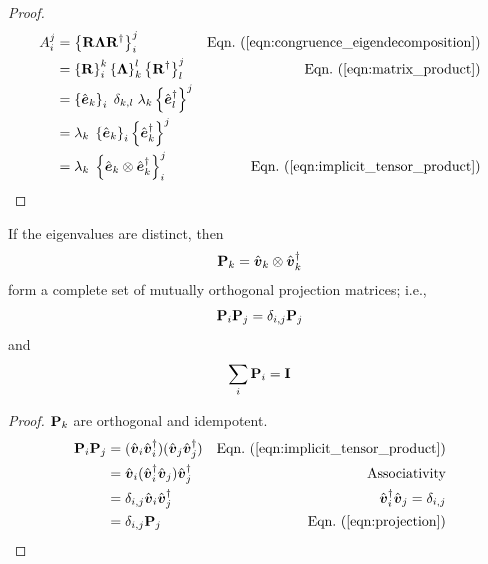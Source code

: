\begin{proof}

\begin{align*}
A_i^j
&= \left\{ {\bf{R}} \cohM{\Lambda} {\bf{R}}^\dagger \right\}_i^j 
    & \peqn{congruence_eigendecomposition} \\
&=  \left\{ {\bf{R}} \right\}_i^k
    \left\{ \cohM{\Lambda} \right\}_k^l
    \left\{ {\bf{R}}^\dagger \right\}_l^j 
    & \peqn{matrix_product} \\
&= \left\{ \hat{\Jcol{e}}_k \right\}_i \; \delta_{k,l} \; \lambda_k \left\{ \hat{\Jcol{e}}_l^\dagger \right\}^j \\
&= \lambda_k \;\left\{ \hat{\Jcol{e}}_k \right\}_i \left\{ \hat{\Jcol{e}}_k^\dagger \right\}^j \\
&= \lambda_k \; \left\{ \hat{\Jcol{e}}_k \otimes \hat{\Jcol{e}}_k^\dagger \right\}_i^j
    & \peqn{implicit_tensor_product}
\label{eqn:eigen_sum}
\end{align*}
%
\end{proof}
\noindent
If the eigenvalues are distinct, then
\begin{equation}
\label{eqn:projection}
{\bf P}_k=\hat{\mbox{\boldmath $v$}}_k \otimes \hat{\mbox{\boldmath $v$}}_k^\dagger
\end{equation}
form a complete set of mutually orthogonal projection matrices; i.e.,
\begin{equation}
\label{eqn:idempotent_orthogonal}
{\bf P}_i {\bf P}_j = \delta_{i,j} {\bf P}_j
\end{equation}
and
\begin{equation}
\sum_i {\bf P}_i = {\bf I}
\label{eqn:projection_complete}
\end{equation}
%
\begin{proof}
\label{proof:orthogonal_idempotent}
${\bf P}_k$ are orthogonal and idempotent.
\begin{align*}
\JM{P}_i \JM{P}_j &= 
(\hat{\Jcol{v}}_i  \hat{\Jcol{v}}_i^\dagger)
(\hat{\Jcol{v}}_j  \hat{\Jcol{v}}_j^\dagger) 
    & \peqn{implicit_tensor_product} \\
&= \hat{\Jcol{v}}_i ( \hat{\Jcol{v}}_i^\dagger
\hat{\Jcol{v}}_j ) \hat{\Jcol{v}}_j^\dagger
    & \text{Associativity} \\
&= \delta_{i,j} \hat{\Jcol{v}}_i \hat{\Jcol{v}}_j^\dagger
   & \hat{\Jcol{v}}_i^\dagger \hat{\Jcol{v}}_j = \delta_{i,j} \\
&= \delta_{i,j} \JM{P}_j & \peqn{projection}
\end{align*}
\end{proof}
%
